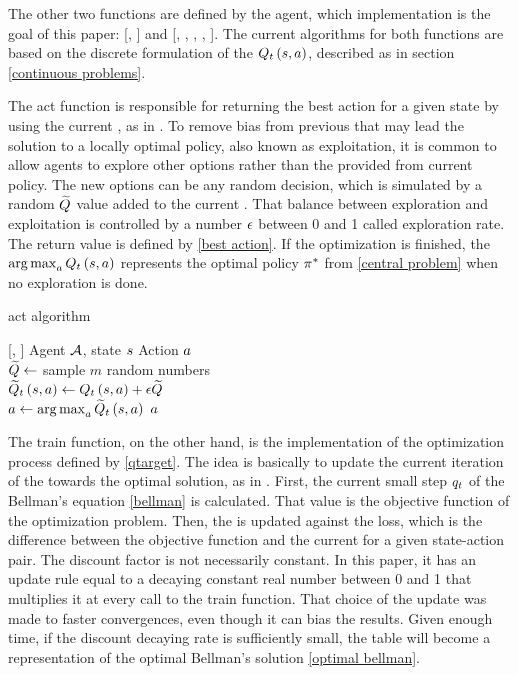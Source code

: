\documentclass[conference]{IEEEtran}
\begin{document}
The other two functions are defined by the agent, which implementation is the goal of this paper: [\agent, \state] and [\agent, \state, \action, \nextstate, \reward].
The current algorithms for both functions are based on the discrete formulation of the $\Qftarget$, described as {\Qtable} in section \ref{continuous problems}.

The act function is responsible for returning the best action for a given state by using the current {\Qtable}, as in .
To remove bias from previous {\Qvalues} that may lead the solution to a locally optimal policy, also known as exploitation, it is common to allow agents to explore other options rather than the provided from current policy.
The new options can be any random decision, which is simulated by a random $\Qrandom$ value added to the current {\Qtable}.
That balance between exploration and exploitation is controlled by a number $\epsilon$ between 0 and 1 called exploration rate.
The return value is defined by \eqref{best action}.
If the optimization is finished, the $\argmax_{\action}{\Qftarget}$ represents the optimal policy $\pi^{*}$ from \eqref{central problem} when no exploration is done.

\begin{algorithm}[t]
    \caption{{\QAgent} act algorithm}
    \begin{algorithmic}[1]
        [\agent, \state]
        \INPUT      Agent $\mathcal{A}$, state $s$
        \OUTPUT     Action $a$
        \\[1.5pt]
        \STATE $ \Qrandom \gets $ sample $m$ random numbers \\[1.5pt]
        \STATE $ \QftargetNoisy \gets \Qftarget + \explorationrate \Qrandom $ \\[1.5pt]
        \STATE $ \action \gets \argmax_{\action}{\QftargetNoisy} $
        \RETURN $a$
    \end{algorithmic}
    \label{act}
\end{algorithm}

The train function, on the other hand, is the implementation of the {\Qlearning} optimization process defined by \eqref{qtarget}.
The idea is basically to update the current iteration of the {\Qtable} towards the optimal solution, as in .
First, the current small step $\qtarget$ of the Bellman's equation \eqref{bellman} is calculated.
That value is the objective function of the optimization problem.
Then, the {\Qtable} is updated against the loss, which is the difference between the objective function and the current {\Qvalue} for a given state-action pair.
The discount factor is not necessarily constant.
In this paper, it has an update rule equal to a decaying constant real number between 0 and 1 that multiplies it at every call to the train function.
That choice of the update was made to faster convergences, even though it can bias the results.
Given enough time, if the discount decaying rate is sufficiently small, the table will become a representation of the optimal Bellman's solution \eqref{optimal bellman}.
\end{document}
